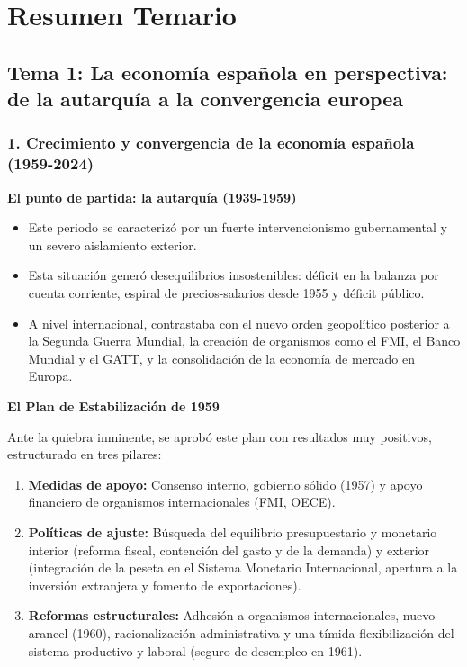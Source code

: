 \chapter{Resumen Temario}
\section*{Tema 1: La economía española en perspectiva: de la autarquía a la convergencia europea}

\subsection*{1. Crecimiento y convergencia de la economía española (1959-2024)}

\textbf{El punto de partida: la autarquía (1939-1959)}

\begin{itemize}
  \item Este periodo se caracterizó por un fuerte intervencionismo gubernamental y un severo aislamiento exterior.
  \item Esta situación generó desequilibrios insostenibles: déficit en la balanza por cuenta corriente, espiral de precios-salarios desde 1955 y déficit público.
  \item A nivel internacional, contrastaba con el nuevo orden geopolítico posterior a la Segunda Guerra Mundial, la creación de organismos como el FMI, el Banco Mundial y el GATT, y la consolidación de la economía de mercado en Europa.
\end{itemize}

\textbf{El Plan de Estabilización de 1959}

Ante la quiebra inminente, se aprobó este plan con resultados muy positivos, estructurado en tres pilares:

\begin{enumerate}
  \item \textbf{Medidas de apoyo:} Consenso interno, gobierno sólido (1957) y apoyo financiero de organismos internacionales (FMI, OECE).
  \item \textbf{Políticas de ajuste:} Búsqueda del equilibrio presupuestario y monetario interior (reforma fiscal, contención del gasto y de la demanda) y exterior (integración de la peseta en el Sistema Monetario Internacional, apertura a la inversión extranjera y fomento de exportaciones).
  \item \textbf{Reformas estructurales:} Adhesión a organismos internacionales, nuevo arancel (1960), racionalización administrativa y una tímida flexibilización del sistema productivo y laboral (seguro de desempleo en 1961).
\end{enumerate}

